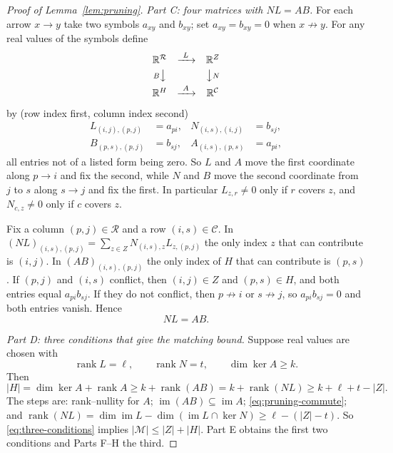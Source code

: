 \documentclass[11pt]{article}
\theoremstyle{remark}
\newcommand{\abs}[1]{\lvert #1\rvert}
\DeclareMathOperator{\rank}{rank}
\DeclareMathOperator{\im}{im}
\newcommand{\R}{\mathbb R}
\begin{document}
\begin{proof}[Proof of Lemma~\ref{lem:pruning}]
\medskip\noindent
\emph{Part C: four matrices with $NL=AB$.}
For each arrow $x\to y$ take two symbols $a_{xy}$ and $b_{xy}$; set
$a_{xy}=b_{xy}=0$ when $x\not\to y$.  For any real values of the symbols
define
\[
 \begin{array}{ccc}
 \R^{\mathcal R}&\xrightarrow{\ L\ }&\R^Z\\[3pt]
 {\scriptstyle B}\big\downarrow&&\big\downarrow{\scriptstyle N}\\[3pt]
 \R^H&\xrightarrow{\ A\ }&\R^{\mathcal C}
 \end{array}
\]
by (row index first, column index second)
\begin{equation}\label{eq:pruning-maps}
 \begin{aligned}
 L_{(i,j),(p,j)}&=a_{pi},&
 N_{(i,s),(i,j)}&=b_{sj},\\
 B_{(p,s),(p,j)}&=b_{sj},&
 A_{(i,s),(p,s)}&=a_{pi},
 \end{aligned}
\end{equation}
all entries not of a listed form being zero.  So $L$ and $A$ move the first
coordinate along $p\to i$ and fix the second, while $N$ and $B$ move the
second coordinate from $j$ to $s$ along $s\to j$ and fix the first.  In
particular $L_{z,r}\ne0$ only if $r$ covers $z$, and $N_{c,z}\ne0$ only if
$c$ covers $z$.

Fix a column $(p,j)\in\mathcal R$ and a row $(i,s)\in\mathcal C$.  In
$(NL)_{(i,s),(p,j)}=\sum_{z\in Z}N_{(i,s),z}L_{z,(p,j)}$ the only index $z$
that can contribute is $(i,j)$.  In $(AB)_{(i,s),(p,j)}$ the only index of
$H$ that can contribute is $(p,s)$.  If $(p,j)$ and $(i,s)$ conflict, then
$(i,j)\in Z$ and $(p,s)\in H$, and both entries equal $a_{pi}b_{sj}$.  If
they do not conflict, then $p\not\to i$ or $s\not\to j$, so
$a_{pi}b_{sj}=0$ and both entries vanish.  Hence
\begin{equation}\label{eq:pruning-commute}
 NL=AB.
\end{equation}

\medskip\noindent
\emph{Part D: three conditions that give the matching bound.}
Suppose real values are chosen with
\begin{equation}\label{eq:three-conditions}
 \rank L=\ell,\qquad \rank N=t,\qquad \dim\ker A\geq k.
\end{equation}
Then
\begin{equation}\label{eq:pruning-rank-bound}
 \abs H=\dim\ker A+\rank A
 \geq k+\rank(AB)=k+\rank(NL)
 \geq k+\ell+t-\abs Z .
\end{equation}
The steps are: rank--nullity for $A$; $\im(AB)\subseteq\im A$;
\eqref{eq:pruning-commute}; and
$\rank(NL)=\dim\im L-\dim(\im L\cap\ker N)\ge\ell-(\abs Z-t)$.
So \eqref{eq:three-conditions} implies
$\abs{\mathcal M}\le\abs Z+\abs H$.  Part E obtains the first two conditions
and Parts F--H the third.


\end{proof}
\end{document}
